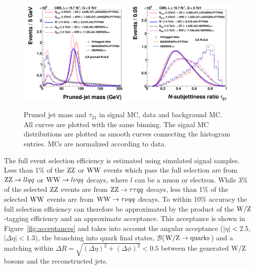 \begin{figure}[htb]
\begin{center}
\includegraphics[width=0.49\textwidth]{EXO-12-024/figs/signal-acc-eff/signal-data-qcd-jetmass.pdf}
\includegraphics[width=0.49\textwidth]{EXO-12-024/figs/signal-acc-eff/signal-data-qcd-Jet-Tau21.pdf}
\end{center}
\caption{Pruned jet mass and $\tau_{21}$ in signal MC, data and background MC.
All curves are plotted with the same binning.
The signal MC distributions are plotted as smooth curves connecting the histogram entries. MCs are normalized according to data.
}
\label{fig:taggingvariables}
\end{figure}


The full event selection efficiency is estimated using simulated
signal samples.
Less than 1\% of the ${\rm Z}{\rm Z}$ or ${\rm W}{\rm W}$ events which pass the full
selection are from ${\rm Z}{\rm Z} \to ll qq$ or ${\rm W}{\rm W} \to l\nu qq$
decays, where $l$ can be a muon or electron.  While 3\% of the
selected ${\rm Z}{\rm Z}$ events are from ${\rm Z}{\rm Z} \to \tau\tau qq$ decays,
less than 1\% of the selected ${\rm W}{\rm W}$ events are from ${\rm W}{\rm W} \to
\tau\nu qq$ decays.
To within 10\% accuracy the full selection efficiency can
therefore be
approximated by the product of the ${\rm W}/{\rm Z}$-tagging efficiency
and an approximate acceptance.
This acceptance is shown in Figure~\ref{fig:acceptances} and
takes into account the angular acceptance
($|\eta| < 2.5$, $|\Delta\eta|<1.3$),
the branching into quark final states,
$\mathcal{B}$(${\rm W}/{\rm Z} \to \text{quarks}$) and a matching within
$\Delta R = \sqrt{(\Delta \eta)^2 + (\Delta\phi)^2} <0.5$
between the generated W/Z bosons and the reconstructed jets.



